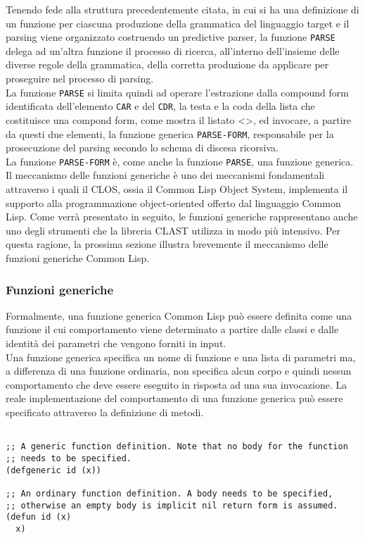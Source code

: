 Tenendo fede alla struttura precedentemente citata, in cui si ha una
definizione di un funzione per ciascuna produzione della grammatica del
linguaggio target e il parsing viene organizzato costruendo un predictive
parser, la funzione \texttt{PARSE} delega ad un’altra funzione il processo di
ricerca, all’interno dell’insieme delle diverse regole della grammatica, della
corretta produzione da applicare per proseguire nel processo di parsing.\\

La funzione \texttt{PARSE} si limita quindi ad operare l'estrazione dalla
compound form identificata dell’elemento \texttt{CAR} e del \texttt{CDR}, la
testa e la coda della lista che costituisce una compond form, come mostra il
listato <>, ed invocare, a partire da questi due elementi, la funzione
generica \texttt{PARSE-FORM}, responsabile per la prosecuzione del parsing
secondo lo schema di discesa ricorsiva.\\

La funzione \texttt{PARSE-FORM} è, come anche la funzione \texttt{PARSE}, una
funzione generica. Il meccanismo delle funzioni generiche è uno dei meccanismi
fondamentali attraverso i quali il CLOS, ossia il Common Lisp Object System,
implementa il supporto alla programmazione object-oriented offerto dal
linguaggio Common Lisp. Come verrà presentato in seguito, le funzioni
generiche rappresentano anche uno degli strumenti che la libreria CLAST
utilizza in modo più intensivo. Per questa ragione, la prossima sezione
illustra brevemente il meccanismo delle funzioni generiche Common Lisp.

\subsubsection{Funzioni generiche}

Formalmente, una funzione generica Common Lisp può essere definita come una
funzione il cui comportamento viene determinato a partire dalle classi e dalle
identità dei parametri che vengono forniti in input.\\

Una funzione generica specifica un nome di funzione e una lista di parametri
ma, a differenza di una funzione ordinaria, non specifica alcun corpo e quindi
nessun comportamento che deve essere eseguito in risposta ad una sua
invocazione. La reale implementazione del comportamento di una funzione
generica può essere specificato attraverso la definizione di metodi.

\begin{lstlisting}[caption=Confronto tra definizione di funzioni generiche e
ordinarie]

;; A generic function definition. Note that no body for the function
;; needs to be specified.
(defgeneric id (x))

;; An ordinary function definition. A body needs to be specified,
;; otherwise an empty body is implicit nil return form is assumed.
(defun id (x)
  x)

\end{lstlisting}

